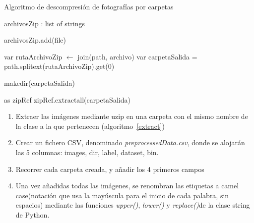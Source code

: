  
 \begin{algorithm}[H]
 	\caption{Algoritmo de descompresión de fotografías por carpetas}
 	 	\label{extract}
 	\begin{algorithmic}[1]
 		
 		 		\State archivosZip : list of strings
 		 		
 			\State archivosZip.add(file)
 		\EndFor

			\State var rutaArchivoZip  $\gets$ join(path, archivo)
			\State var carpetaSalida = path.splitext(rutaArchivoZip).get(0) 
		
				\State makedir(carpetaSalida) 

			\State {} as zipRef
			\State zipRef.extractall(carpetaSalida)
			 \EndIf
		\EndFor
 		\EndProcedure
 		
 	\end{algorithmic}
 \end{algorithm}
 
 


\begin{enumerate}
	\item Extraer las imágenes mediante uzip en una carpeta con el mismo nombre de la clase a la que pertenecen (algoritmo~\ref{extract})
	\item Crear un fichero CSV, denominado \textit{preprocessedData.csv}, donde se alojarán las 5 columnas: images, dir, label, dataset, bin.
	\item Recorrer cada carpeta creada, y añadir los 4 primeros campos
	\item Una vez añadidas todas las imágenes, se renombran las etiquetas a camel case(notación que usa la mayúscula para el inicio de cada palabra, sin espacios) mediante las funciones \textit{upper()}, \textit{lower()} y\textit{ replace()}de la clase string de Python.
\end{enumerate}

